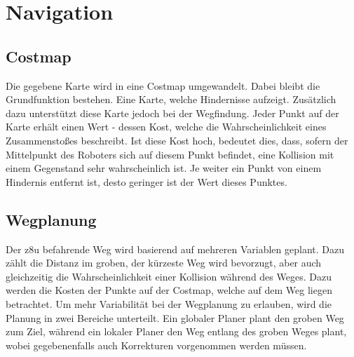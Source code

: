 \section{Navigation}
{	
		\subsection{Costmap}
		{
			Die gegebene Karte wird in eine Costmap umgewandelt. Dabei bleibt die Grundfunktion bestehen. Eine Karte, welche Hindernisse aufzeigt. Zusätzlich dazu unterstützt diese Karte jedoch bei der Wegfindung. Jeder Punkt auf der Karte erhält einen Wert - dessen Kost, welche die Wahrscheinlichkeit eines Zusammenstoßes beschreibt. Ist diese Kost hoch, bedeutet dies, dass, sofern der Mittelpunkt des Roboters sich auf diesem Punkt befindet, eine Kollision mit einem Gegenstand sehr wahrscheinlich ist. Je weiter ein Punkt von einem Hindernis entfernt ist, desto geringer ist der Wert dieses Punktes. 
		}
	
		\subsection{Wegplanung}
		{
			Der z8u befahrende Weg wird basierend auf mehreren Variablen geplant. Dazu zählt die Distanz im groben, \dahe der kürzeste Weg wird bevorzugt, aber auch gleichzeitig die Wahrscheinlichkeit einer Kollision während des Weges. Dazu werden die Kosten der Punkte auf der Costmap, welche auf dem Weg liegen betrachtet. Um mehr Variabilität bei der Wegplanung zu erlauben, wird die Planung in zwei Bereiche unterteilt. Ein globaler Planer plant den groben Weg zum Ziel, während ein lokaler Planer den Weg entlang des groben Weges plant, wobei gegebenenfalls auch Korrekturen vorgenommen werden müssen.
		}
}
